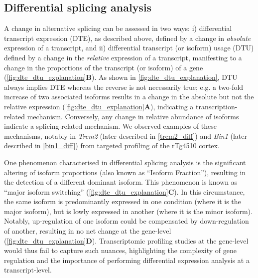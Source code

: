 \subsection{Differential splicing analysis}\label{intro:dtu}
A change in alternative splicing can be assessed in two ways: i) differential transcript expression (DTE), as described above, defined by a change in \textit{absolute} expression of a transcript, and ii) differential transcript (or isoform) usage (DTU) defined by a change in the \textit{relative} expression of a transcript, manifesting to a change in the proportions of the transcript (or isoform) of a gene (\cref{fig:dte_dtu_explanation}\textbf{B}). As shown in \cref{fig:dte_dtu_explanation}, DTU always implies DTE whereas the reverse is not necessarily true; e.g. a two-fold increase of two associated isoforms results in a change in the absolute but not the relative expression (\cref{fig:dte_dtu_explanation}\textbf{A}), indicating a transcription-related mechanism. Conversely, any change in relative abundance of isoforms indicate a splicing-related mechanism. We observed examples of these mechanisms, notably in \textit{Trem2} (later described in \cref{trem2_diff}) and \textit{Bin1} (later described in \cref{bin1_diff}) from targeted profiling of the rTg4510 cortex.

One phenomenon characterised in differential splicing analysis is the significant altering of isoform proportions (also known as “Isoform Fraction”), resulting in the detection of a different dominant isoform. This phenomenon is known as “major isoform switching” (\cref{fig:dte_dtu_explanation}\textbf{C}). In this circumstance, the same isoform is predominantly expressed in one condition (where it is the major isoform), but is lowly expressed in another (where it is the minor isoform). Notably, up-regulation of one isoform could be compensated by down-regulation of another, resulting in no net change at the gene-level (\cref{fig:dte_dtu_explanation}\textbf{D}). Transcriptomic profiling studies at the gene-level would thus fail to capture such nuances, highlighting the complexity of gene regulation and the importance of performing differential expression analysis at a transcript-level. 


